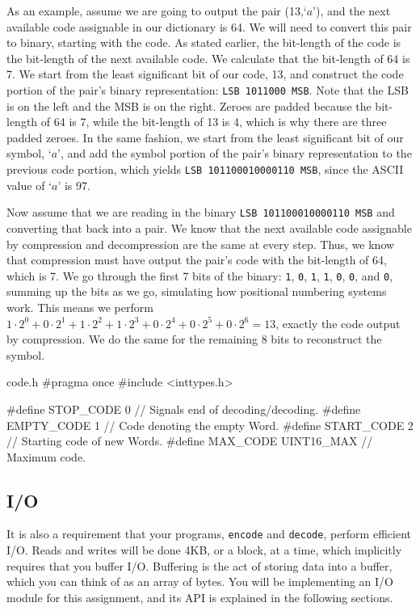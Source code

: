 \documentclass{article}
\begin{document}
As an example, assume we are going to output the pair (13,\;`$a$'), and the next
available code assignable in our dictionary is 64. We will need to convert this
pair to binary, starting with the code. As stated earlier, the bit-length of the
code is the bit-length of the next available code. We calculate that the bit-length
of 64 is 7. We start from the least significant bit of our code, 13, and
construct the code portion of the pair's binary representation:
\texttt{LSB 1011000 MSB}. Note that the LSB is on the left and the MSB
is on the right. Zeroes are padded because the bit-length of 64 is 7,
while the bit-length of 13 is 4, which is why there are three padded
zeroes.  In the same fashion, we start from the least significant bit of
our symbol, `$a$', and add the symbol portion of the pair's binary
representation to the previous code portion, which yields \texttt{LSB
101100010000110 MSB}, since the ASCII value of `$a$' is 97.

Now assume that we are reading in the binary \texttt{LSB 101100010000110
MSB} and converting that back into a pair. We know that the next
available code assignable by compression and decompression are the same
at every step. Thus, we know that compression must have output the
pair's code with the bit-length of 64, which is 7. We go through the
first 7 bits of the binary: \texttt{1}, \texttt{0}, \texttt{1},
\texttt{1}, \texttt{0}, \texttt{0}, and \texttt{0}, summing up the bits
as we go, simulating how positional numbering systems work.  This means
we perform $1 \cdot 2^0 + 0 \cdot 2^1 + 1 \cdot 2^2 + 1 \cdot 2^3 + 0
\cdot 2^4 + 0 \cdot 2^5 + 0 \cdot 2^6 = 13$, exactly the code output by
compression. We do the same for the remaining 8 bits to reconstruct the
symbol.

\begin{clisting}{code.h}
#pragma once
#include <inttypes.h>

#define STOP_CODE   0         // Signals end of decoding/decoding.
#define EMPTY_CODE  1             // Code denoting the empty Word.
#define START_CODE  2             // Starting code of new Words.
#define MAX_CODE    UINT16_MAX    // Maximum code.

\end{clisting}

\subsection{I/O}

It is also a requirement that your programs, \texttt{encode} and
\texttt{decode}, perform efficient I/O. Reads and writes will be done 4KB, or a
block, at a time, which implicitly requires that you buffer I/O. Buffering is
the act of storing data into a buffer, which you can think of as an array of
bytes. You will be implementing an I/O module for this assignment, and its
API is explained in the following sections.
\end{document}
